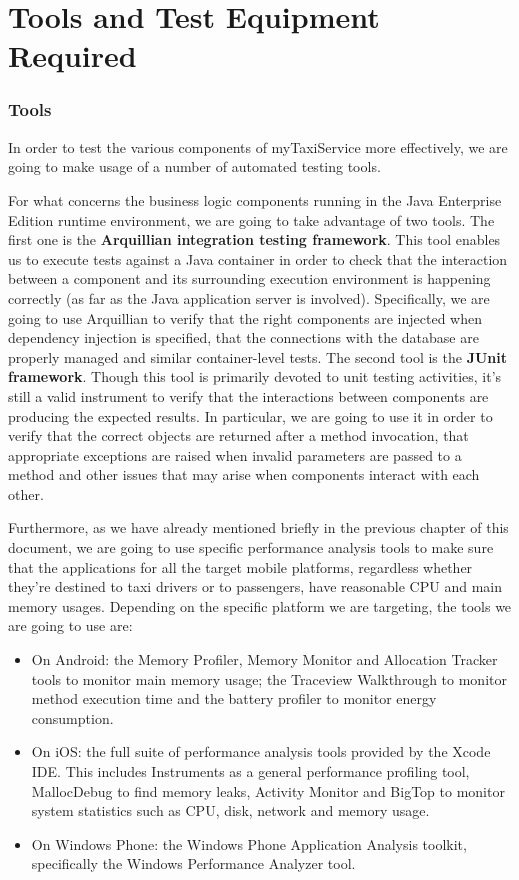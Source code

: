 \chapter{Tools and Test Equipment Required}
\subsection{Tools}
In order to test the various components of myTaxiService more effectively, we are going to make usage of a number of automated testing tools. 

For what concerns the business logic components running in the Java Enterprise Edition runtime environment, we are going to take advantage of two tools.
The first one is the \textbf{Arquillian integration testing framework}. This tool enables us to execute tests against a Java container in order to check that the interaction between a component and its surrounding execution environment is happening correctly (as far as the Java application server is involved). Specifically, we are going to use Arquillian to verify that the right components are injected when dependency injection is specified, that the connections with the database are properly managed and similar container-level tests.
The second tool is the \textbf{JUnit framework}. Though this tool is primarily devoted to unit testing activities, it's still a valid instrument to verify that the interactions between components are producing the expected results. In particular, we are going to use it in order to verify that the correct objects are returned after a method invocation, that appropriate exceptions are raised when invalid parameters are passed to a method and other issues that may arise when components interact with each other.

Furthermore, as we have already mentioned briefly in the previous chapter of this document, we are going to use specific performance analysis tools to make sure that the applications for all the target mobile platforms, regardless whether they're destined to taxi drivers or to passengers, have reasonable CPU and main memory usages. Depending on the specific platform we are targeting, the tools we are going to use are:
\begin{itemize}
	\item On Android: the Memory Profiler, Memory Monitor and Allocation Tracker tools to monitor main memory usage; the Traceview Walkthrough to monitor method execution time and the battery profiler to monitor energy consumption.
	\item On iOS: the full suite of performance analysis tools provided by the Xcode IDE. This includes Instruments as a general performance profiling tool, MallocDebug to find memory leaks, Activity Monitor and BigTop to monitor system statistics such as CPU, disk, network and memory usage. 
	\item On Windows Phone: the Windows Phone Application Analysis toolkit, specifically the Windows Performance Analyzer tool.
\end{itemize}

